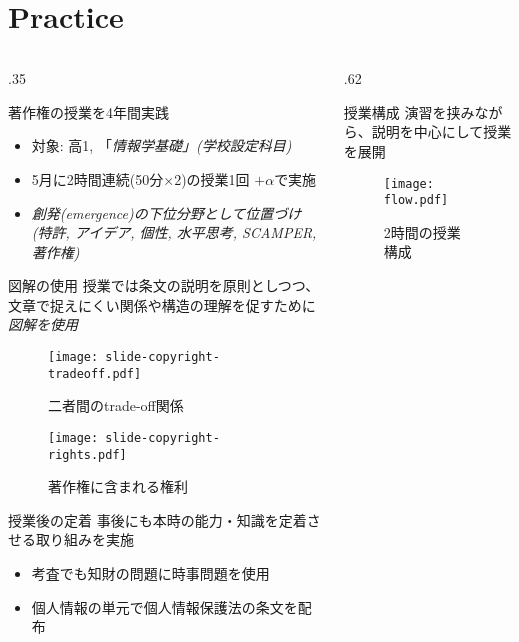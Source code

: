 \section{Practice}
\begin{columns}[onlytextwidth,t]
\begin{column}{.35\hsize}
\begin{exampleblock}{\insertsection}
著作権の授業を4年間実践
\begin{itemize}
	\item 対象: 高1, 「\em{情報学基礎}」(学校設定科目)
	\item 5月に2時間連続(50分×2)の授業1回 $+ \alpha$で実施
	\item \em{創発}(emergence)の下位分野として位置づけ \\
		(特許, アイデア, 個性, 水平思考, SCAMPER, \alert{著作権})
\end{itemize}
\end{exampleblock}

\begin{block}{図解の使用}
授業では条文の説明を原則としつつ、文章で捉えにくい関係や構造の理解を促すために\em{図解}を使用
\begin{figure}[hbtp]{\centering
\texttt{[image: slide-copyright-tradeoff.pdf]}
\caption{二者間のtrade-off関係}
}\end{figure}
\begin{figure}[hbtp]{\centering
\texttt{[image: slide-copyright-rights.pdf]}
\caption{著作権に含まれる権利}
}\end{figure}
\end{block}

\begin{block}{授業後の定着}
事後にも本時の能力・知識を定着させる取り組みを実施
\begin{itemize}
\item 考査でも知財の問題に時事問題を使用
\item 個人情報の単元で個人情報保護法の条文を配布
\end{itemize}
\end{block}
\end{column}
\begin{column}{.62\hsize}
\begin{block}{授業構成}
演習を挟みながら、説明を中心にして授業を展開
\begin{figure}[hbtp]{\centering
\texttt{[image: flow.pdf]}
\caption{2時間の授業構成}
}\end{figure}
\end{block}


\end{column}
\end{columns}
